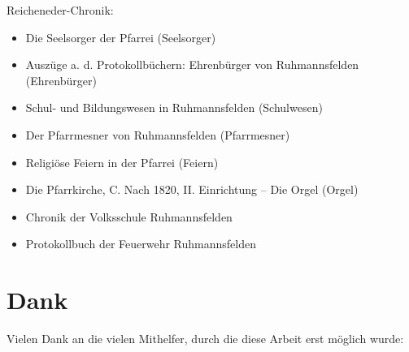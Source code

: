 \documentclass{book}
\begin{document}
\noindent Reicheneder-Chronik:

\begin{itemize}

\item Die Seelsorger der Pfarrei (Seelsorger)
\item Auszüge a. d. Protokollbüchern: Ehrenbürger von Ruhmannsfelden
(Ehrenbürger)
\item Schul- und Bildungswesen in Ruhmannsfelden (Schulwesen)
\item Der Pfarrmesner von Ruhmannsfelden (Pfarrmesner)
\item Religiöse Feiern in der Pfarrei (Feiern)
\item Die Pfarrkirche, C. Nach 1820, II. Einrichtung – Die Orgel (Orgel)
\item Chronik der Volksschule Ruhmannsfelden
\item Protokollbuch der Feuerwehr Ruhmannsfelden

\end{itemize}

\section{Dank}

Vielen Dank an die vielen Mithelfer, durch die diese Arbeit erst möglich
wurde:
\end{document}
